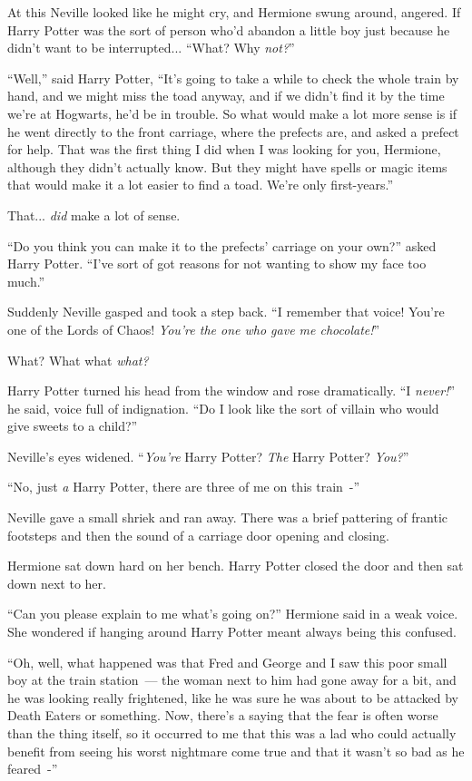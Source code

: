 At this Neville looked like he might cry, and Hermione swung around, angered. If Harry Potter was the sort of person who'd abandon a little boy just because he didn't want to be interrupted... ``What? Why \emph{not?}''

``Well,'' said Harry Potter, ``It's going to take a while to check the whole train by hand, and we might miss the toad anyway, and if we didn't find it by the time we're at Hogwarts, he'd be in trouble. So what would make a lot more sense is if he went directly to the front carriage, where the prefects are, and asked a prefect for help. That was the first thing I did when I was looking for you, Hermione, although they didn't actually know. But they might have spells or magic items that would make it a lot easier to find a toad. We're only first-years.''

That... \emph{did} make a lot of sense.

``Do you think you can make it to the prefects' carriage on your own?'' asked Harry Potter. ``I've sort of got reasons for not wanting to show my face too much.''

Suddenly Neville gasped and took a step back. ``I remember that voice! You're one of the Lords of Chaos! \emph{You're the one who gave me chocolate!}''

What? What what \emph{what?}

Harry Potter turned his head from the window and rose dramatically. ``I \emph{never!}'' he said, voice full of indignation. ``Do I look like the sort of villain who would give sweets to a child?''

Neville's eyes widened. ``\emph{You're} Harry Potter? \emph{The} Harry Potter? \emph{You?}''

``No, just \emph{a} Harry Potter, there are three of me on this train~-''

Neville gave a small shriek and ran away. There was a brief pattering of frantic footsteps and then the sound of a carriage door opening and closing.

Hermione sat down hard on her bench. Harry Potter closed the door and then sat down next to her.

``Can you please explain to me what's going on?'' Hermione said in a weak voice. She wondered if hanging around Harry Potter meant always being this confused.

``Oh, well, what happened was that Fred and George and I saw this poor small boy at the train station~--- the woman next to him had gone away for a bit, and he was looking really frightened, like he was sure he was about to be attacked by Death Eaters or something. Now, there's a saying that the fear is often worse than the thing itself, so it occurred to me that this was a lad who could actually benefit from seeing his worst nightmare come true and that it wasn't so bad as he feared~-''

